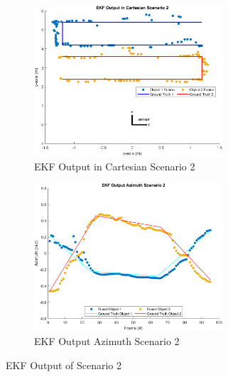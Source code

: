 \begin{figure}[!htb]
    \hspace{0.1\textwidth}
    \begin{subfigure}[b]{0.3\textwidth}%
        \includegraphics[width=7cm]{Figures/matlab/EKF Output in Cartesian Scenario 2.png}
        \caption{EKF Output in Cartesian Scenario 2}
        \label{subfig:ekf_cart_2}
    \end{subfigure}
    \hspace{0.15\textwidth}
    \begin{subfigure}[b]{0.3\textwidth}%
        \includegraphics[width=7cm]{Figures/matlab/EKF Output Azimuth Scenario 2.png}
        \caption{EKF Output Azimuth Scenario 2}
        \label{subfig:ekf_azi_2}
    \end{subfigure}

    \caption{EKF Output of Scenario 2}
    \label{fig:ekf_2}
\end{figure}


\newpage 
